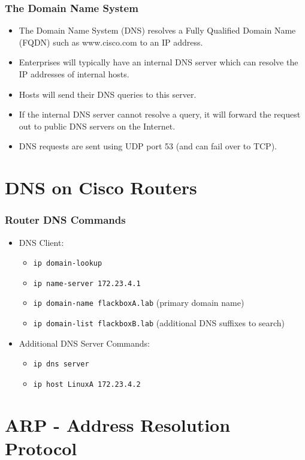 \documentclass[pdflatex,compress,mathserif]{beamer}
\begin{document}
\begin{frame}
	\frametitle{The Domain Name System}
	\begin{itemize}
		\item The Domain Name System (DNS) resolves a Fully Qualified Domain Name (FQDN) such as www.cisco.com to an IP address.
		\item Enterprises will typically have an internal DNS server which can resolve the IP addresses of internal hosts.
		\item Hosts will send their DNS queries to this server.
		\item If the internal DNS server cannot resolve a query, it will forward the request out to public DNS servers on the Internet.
		\item DNS requests are sent using UDP port 53 (and can fail over to TCP).
	\end{itemize}
\end{frame}

\section{DNS on Cisco Routers}

\begin{frame}
	\frametitle{Router DNS Commands}
	\begin{itemize}
		\item DNS Client:
		\begin{itemize}
			\item[] \texttt{ip domain-lookup}
			\item[] \texttt{ip name-server 172.23.4.1}
			\item[] \texttt{ip domain-name flackboxA.lab} (primary domain name)
			\item[] \texttt{ip domain-list flackboxB.lab} (additional DNS suffixes to search)
		\end{itemize}
		\item Additional DNS Server Commands:
		\begin{itemize}
			\item[] \texttt{ip dns server}
			\item[] \texttt{ip host LinuxA 172.23.4.2}
		\end{itemize}
	\end{itemize}
\end{frame}

\section{ARP - Address Resolution Protocol}
\end{document}
